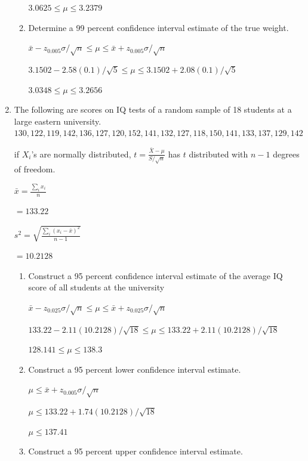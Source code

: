 \documentclass{article}
\begin{document}
\begin{enumerate}
\begin{enumerate}
        $3.0625 \leq \mu \leq 3.2379$
        \item Determine a 99 percent confidence interval estimate of the true weight.
        
        $\bar{x} - z_{0.005}\sigma/\sqrt{n} \leq \mu \leq \bar{x} + z_{0.005}\sigma/\sqrt{n}$

        $3.1502 - 2.58(0.1)/\sqrt{5} \leq \mu \leq 3.1502 + 2.08(0.1)/\sqrt{5}$

        $3.0348 \leq \mu \leq 3.2656$
    \end{enumerate}

    \item  The following are scores on IQ tests of a random sample of 18 students at a large eastern university.
    $130, 122, 119, 142, 136, 127, 120, 152, 141, 132, 127, 118, 150, 141, 133, 137, 129, 142$
    
    if $X_i$'s are normally distributed, $\displaystyle t=\frac{\bar{X}-\mu}{S/\sqrt{n}}$ has $t$ distributed with $n-1$ degrees of freedom.

    $\displaystyle \bar{x} = \frac{\sum_{i}{x_i}}{n}$

    $= 133.22$
    
    $\displaystyle s^2=\sqrt{\frac{\sum_i{(x_i-\bar{x})^2}}{n-1}}$

    $= 10.2128$

    \begin{enumerate}
        \item Construct a 95 percent confidence interval estimate of the average IQ score of all students at the university
        
        $\bar{x} - z_{0.025}\sigma/\sqrt{n} \leq \mu \leq \bar{x} + z_{0.025}\sigma/\sqrt{n}$

        $133.22 - 2.11(10.2128)/\sqrt{18} \leq \mu \leq 133.22 + 2.11(10.2128)/\sqrt{18}$

        $128.141 \leq \mu \leq 138.3$

        \item Construct a 95 percent lower confidence interval estimate.
        
        $\mu \leq \bar{x} + z_{0.005}\sigma/\sqrt{n}$

        $\mu \leq 133.22 + 1.74(10.2128)/\sqrt{18}$

        $\mu \leq 137.41$

        \item Construct a 95 percent upper confidence interval estimate.
        

\end{enumerate}
\end{enumerate}
\end{document}
